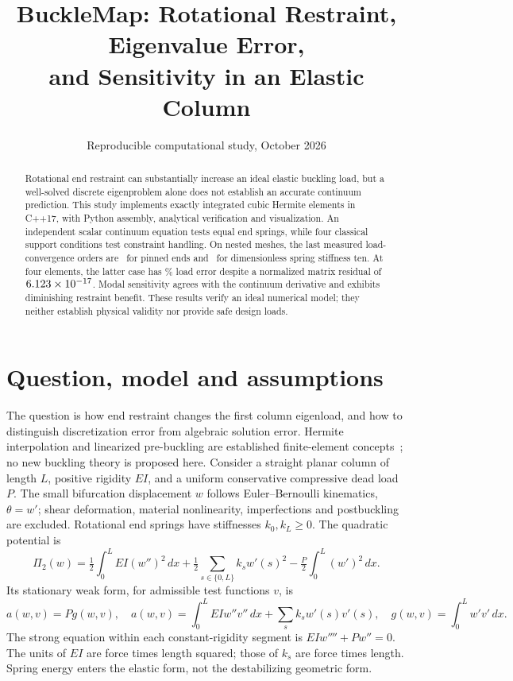 \documentclass[10pt,a4paper]{article}
\title{BuckleMap: Rotational Restraint, Eigenvalue Error,\\
and Sensitivity in an Elastic Column}
\author{}
\date{Reproducible computational study, October 2026}
\begin{document}
\maketitle
\vspace{-7mm}
\begin{abstract}
Rotational end restraint can substantially increase an ideal elastic buckling
load, but a well-solved discrete eigenproblem alone does not establish an
accurate continuum prediction. This study implements exactly integrated cubic
Hermite elements in C++17, with Python assembly, analytical verification and
visualization. An independent scalar continuum equation tests equal end
springs, while four classical support conditions test constraint handling.
On nested meshes, the last measured load-convergence orders are \PinnedOrder\
for pinned ends and \SpringOrder\ for dimensionless spring stiffness ten.
At four elements, the latter case has \CoarsePercent\% load error despite a
normalized matrix residual of $6.123\times10^{-17}$. Modal sensitivity agrees with
the continuum derivative and exhibits diminishing restraint benefit. These
results verify an ideal numerical model; they neither establish physical
validity nor provide safe design loads.
\end{abstract}

\section{Question, model and assumptions}
The question is how end restraint changes the first column eigenload, and how
to distinguish discretization error from algebraic solution error. Hermite
interpolation and linearized pre-buckling are established finite-element
concepts~\cite{hermite,nonlinear}; no new buckling theory is proposed here.
Consider a straight planar column of length $L$, positive rigidity $EI$,
and a uniform conservative compressive dead load $P$. The small bifurcation
displacement $w$ follows Euler--Bernoulli kinematics, $\theta=w'$; shear
deformation, material nonlinearity, imperfections and postbuckling are excluded.
Rotational end springs have stiffnesses $k_0,k_L\ge0$. The quadratic potential is
\begin{equation}
 \Pi_2(w)=\tfrac12\int_0^L EI(w'')^2\,dx
  +\tfrac12\sum_{s\in\{0,L\}}k_s w'(s)^2
  -\tfrac P2\int_0^L(w')^2\,dx.
\end{equation}
Its stationary weak form, for admissible test functions $v$, is
\begin{equation}
 a(w,v)=Pg(w,v),\quad a(w,v)=\int_0^L EI w''v''\,dx+\sum_s k_s w'(s)v'(s),
 \quad g(w,v)=\int_0^L w'v'\,dx. \label{eq:weak}
\end{equation}
The strong equation within each constant-rigidity segment is $EIw''''+Pw''=0$.
The units of $EI$ are force times length squared; those of $k_s$ are force
times length. Spring energy enters the elastic form, not the destabilizing
geometric form.
\end{document}
